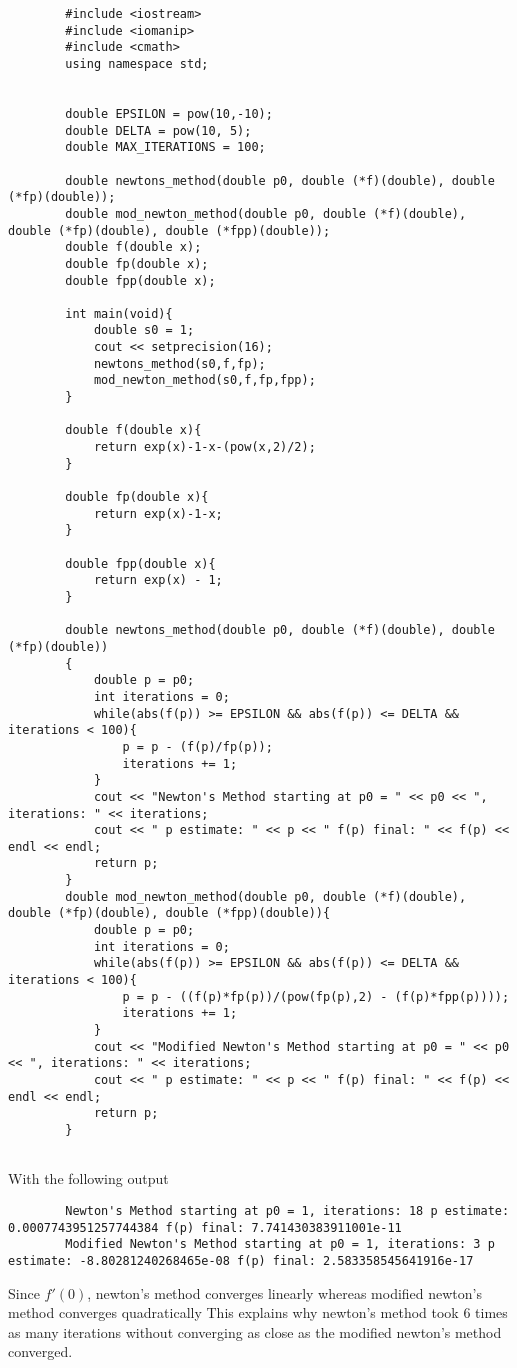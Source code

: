 \documentclass{amsart}
\begin{document}
    \begin{lstlisting}
        #include <iostream>
        #include <iomanip>
        #include <cmath>
        using namespace std;


        double EPSILON = pow(10,-10);
        double DELTA = pow(10, 5);
        double MAX_ITERATIONS = 100;

        double newtons_method(double p0, double (*f)(double), double (*fp)(double));
        double mod_newton_method(double p0, double (*f)(double), double (*fp)(double), double (*fpp)(double));
        double f(double x);
        double fp(double x);
        double fpp(double x);

        int main(void){
            double s0 = 1;
            cout << setprecision(16);
            newtons_method(s0,f,fp);
            mod_newton_method(s0,f,fp,fpp);
        }

        double f(double x){
            return exp(x)-1-x-(pow(x,2)/2);
        }

        double fp(double x){
            return exp(x)-1-x;
        }

        double fpp(double x){
            return exp(x) - 1;
        }

        double newtons_method(double p0, double (*f)(double), double (*fp)(double))
        {
            double p = p0;
            int iterations = 0;
            while(abs(f(p)) >= EPSILON && abs(f(p)) <= DELTA && iterations < 100){
                p = p - (f(p)/fp(p));
                iterations += 1;
            }
            cout << "Newton's Method starting at p0 = " << p0 << ", iterations: " << iterations;
            cout << " p estimate: " << p << " f(p) final: " << f(p) << endl << endl;
            return p;
        }
        double mod_newton_method(double p0, double (*f)(double), double (*fp)(double), double (*fpp)(double)){
            double p = p0;
            int iterations = 0;
            while(abs(f(p)) >= EPSILON && abs(f(p)) <= DELTA && iterations < 100){
                p = p - ((f(p)*fp(p))/(pow(fp(p),2) - (f(p)*fpp(p))));
                iterations += 1;
            }
            cout << "Modified Newton's Method starting at p0 = " << p0 << ", iterations: " << iterations;
            cout << " p estimate: " << p << " f(p) final: " << f(p) << endl << endl;
            return p;
        }


    \end{lstlisting}

    With the following output 
    \begin{lstlisting}
        Newton's Method starting at p0 = 1, iterations: 18 p estimate: 0.0007743951257744384 f(p) final: 7.741430383911001e-11
        Modified Newton's Method starting at p0 = 1, iterations: 3 p estimate: -8.80281240268465e-08 f(p) final: 2.583358545641916e-17
    \end{lstlisting}
    Since $f'(0)$, newton's method converges linearly whereas modified newton's method converges quadratically
    This explains why newton's method took 6 times as many iterations without converging as close as the modified newton's method converged.
\end{document}
